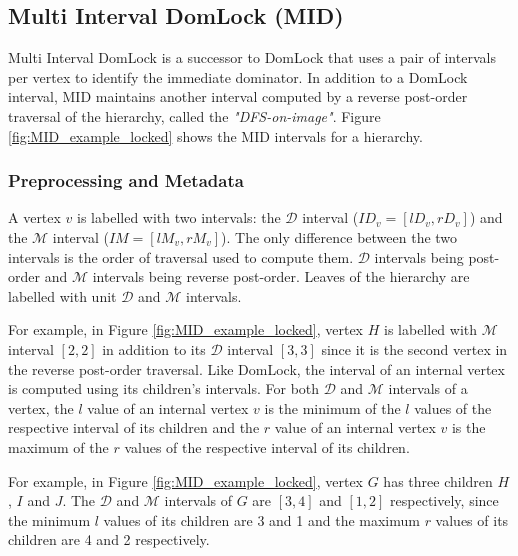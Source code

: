 \subsection{Multi Interval DomLock (MID)}
Multi Interval DomLock \cite{anjuMID} is a successor to DomLock that uses a pair of intervals per vertex to identify the immediate dominator. In addition to a DomLock interval, MID maintains another interval computed by a reverse post-order traversal of the hierarchy, called the \emph{"DFS-on-image"}. Figure \ref{fig:MID_example_locked} shows the MID intervals for a hierarchy. 

\subsubsection{Preprocessing and Metadata}

A vertex $v$ is labelled with two intervals: the $\mathcal{D}$ interval ($\mathit{ID}_v = [\mathit{lD}_v, \mathit{rD}_v]$) and the $\mathcal{M}$ interval ($\mathit{IM} = [\mathit{lM}_v, \mathit{rM}_v]$). The only difference between the two intervals is the order of traversal used to compute them. $\mathcal{D}$ intervals being post-order and $\mathcal{M}$ intervals being reverse post-order. Leaves of the hierarchy are labelled with unit $\mathcal{D}$ and $\mathcal{M}$ intervals. 

For example, in Figure \ref{fig:MID_example_locked}, vertex $H$ is labelled with $\mathcal{M}$ interval $[2,2]$ in addition to its $\mathcal{D}$ interval $[3,3]$ since it is the second vertex in the reverse post-order traversal. Like DomLock, the interval of an internal vertex is computed using its children's intervals. For both $\mathcal{D}$ and $\mathcal{M}$ intervals of a vertex, the $l$ value of an internal vertex $v$ is the minimum of the $l$ values of the respective interval of its children and the $r$ value of an internal vertex $v$ is the maximum of the $r$ values of the respective interval of its children.

For example, in Figure \ref{fig:MID_example_locked}, vertex $G$ has three children $H$, $I$ and $J$. The $\mathcal{D}$ and $\mathcal{M}$ intervals of $G$ are $[3,4]$ and $[1,2]$ respectively, since the minimum $l$ values of its children are 3 and 1 and the maximum $r$ values of its children are 4 and 2 respectively.

